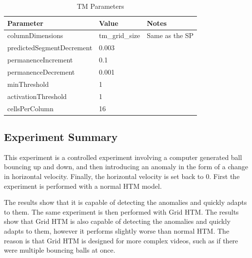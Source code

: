\begin{table}[H]
    \centering
    \begin{tabularx}{\linewidth}{@{}XlX@{}}
        \toprule
        \textbf{Parameter}        & \textbf{Value} & \textbf{Notes} \\
        \midrule
        columnDimensions          & tm\_grid\_size & Same as the SP \\
        predictedSegmentDecrement & 0.003          &                \\
        permanenceIncrement       & 0.1            &                \\
        permanenceDecrement       & 0.001          &                \\
        minThreshold              & 1              &                \\
        activationThreshold       & 1              &                \\
        cellsPerColumn            & 16             &                \\
        \bottomrule
    \end{tabularx}
    \caption{TM Parameters}
    \label{tab:bb_tm_gridhtm_param}
\end{table}
\subsection{Experiment Summary}
This experiment is a controlled experiment involving a computer generated ball bouncing up and down, and then introducing an anomaly in the form of a change in horizontal velocity. Finally, the horizontal velocity is set back to 0. First the experiment is performed with a normal HTM model.
\par
The results show that it is capable of detecting the anomalies and quickly adapts to them. The same experiment is then performed with Grid HTM. The results show that Grid HTM is also capable of detecting the anomalies and quickly adapts to them, however it performs slightly worse than normal HTM. The reason is that Grid HTM is designed for more complex videos, such as if there were multiple bouncing balls at once.
\clearpage
